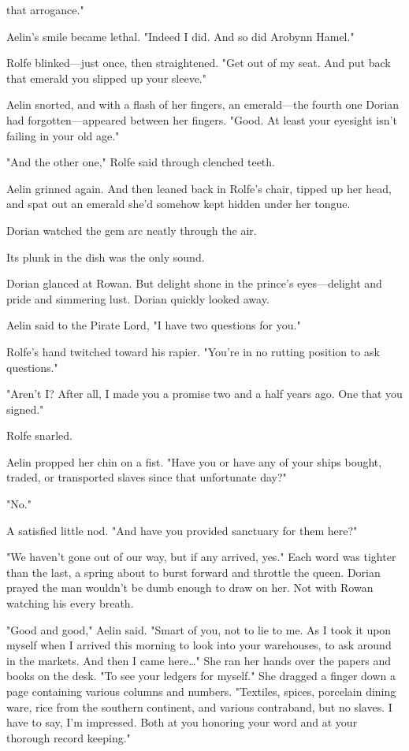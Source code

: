 that arrogance."

Aelin's smile became lethal. "Indeed I did. And so did Arobynn Hamel."

Rolfe blinked---just once, then straightened. "Get out of my seat. And put back that emerald you slipped up your sleeve."

Aelin snorted, and with a flash of her fingers, an emerald---the fourth one Dorian had forgotten---appeared between her fingers. "Good. At least your eyesight isn't failing in your old age."

"And the other one," Rolfe said through clenched teeth.

Aelin grinned again. And then leaned back in Rolfe's chair, tipped up her head, and spat out an emerald she'd somehow kept hidden under her tongue.

Dorian watched the gem arc neatly through the air.

Its plunk in the dish was the only sound.

Dorian glanced at Rowan. But delight shone in the prince's eyes---delight and pride and simmering lust. Dorian quickly looked away.

Aelin said to the Pirate Lord, "I have two questions for you."

Rolfe's hand twitched toward his rapier. "You're in no rutting position to ask questions."

"Aren't I? After all, I made you a promise two and a half years ago. One that you signed."

Rolfe snarled.

Aelin propped her chin on a fist. "Have you or have any of your ships bought, traded, or transported slaves since that  unfortunate day?"

"No."

A satisfied little nod. "And have you provided sanctuary for them here?"

"We haven't gone out of our way, but if any arrived, yes." Each word was tighter than the last, a spring about to burst forward and throttle the queen. Dorian prayed the man wouldn't be dumb enough to draw on her. Not with Rowan watching his every breath.

"Good and good," Aelin said. "Smart of you, not to lie to me. As I took it upon myself when I arrived this morning to look into your warehouses, to ask around in the markets. And then I came here\ldots" She ran her hands over the papers and books on the desk. "To see your ledgers for myself." She dragged a finger down a page containing various columns and numbers. "Textiles, spices, porcelain dining ware, rice from the southern continent, and various contraband, but 
no slaves. I have to say, I'm impressed. Both at you honoring your word and at your thorough record keeping."

